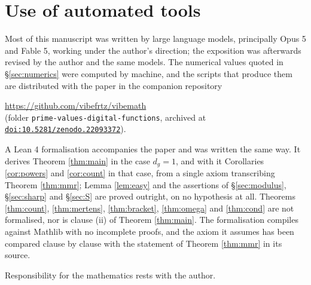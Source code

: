 \documentclass[11pt,reqno]{amsart}
\theoremstyle{plain}
\theoremstyle{definition}
\begin{document}
\section*{Use of automated tools}

Most of this manuscript was written by large language models, principally Opus 5
and Fable 5, working under the author's direction; the exposition was afterwards
revised by the author and the same models. The numerical values quoted in
\S\ref{sec:numerics} were computed by machine, and the scripts that produce them
are distributed with the paper in the companion repository
\begin{center}
  \url{https://github.com/vibefrtz/vibemath}\\[2pt]
  (folder \texttt{prime-values-digital-functions}, archived at
  \href{https://doi.org/10.5281/zenodo.22093372}{\texttt{doi:10.5281/zenodo.22093372}}).
\end{center}

A Lean 4 formalisation accompanies the paper and was written the same way. It
derives Theorem \ref{thm:main} in the case $d_g=1$, and with it Corollaries
\ref{cor:powers} and \ref{cor:count} in that case, from a single axiom
transcribing Theorem \ref{thm:mmr}; Lemma \ref{lem:easy} and the assertions of
\S\ref{sec:modulus}, \S\ref{sec:sharp} and \S\ref{sec:S} are proved outright, on
no hypothesis at all. Theorems \ref{thm:count}, \ref{thm:mertens},
\ref{thm:bracket}, \ref{thm:omega} and \ref{thm:cond} are not formalised, nor is
clause (ii) of Theorem \ref{thm:main}. The formalisation compiles against
Mathlib with no incomplete proofs, and the axiom it assumes has been compared
clause by clause with the statement of Theorem \ref{thm:mmr} in its source.

Responsibility for the mathematics rests with the author.
\end{document}
